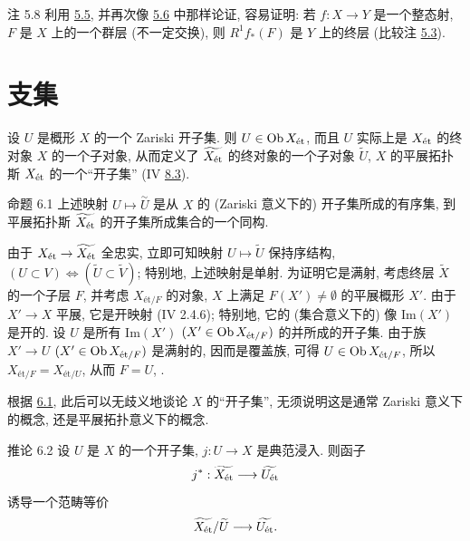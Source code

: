 \begin{enonce*}[remark]{注 5.8}
利用 \hyperref[VIII.prop5.5]{5.5},
并再次像 \hyperref[VIII.cor5.6]{5.6} 中那样论证, 容易证明:
若 $f:X\to Y$ 是一个整态射, $F$ 是 $X$ 上的一个群层 (不一定交换),
则 $R^1f_*(F)$ 是 $Y$ 上的终层 (比较注 \hyperref[VIII.rem5.3]{5.3}).
\end{enonce*}




\section{支集}\pageoriginale{}

设 $U$ 是概形 $X$ 的一个 Zariski 开子集.
则 $U \in \operatorname{Ob} X_{\text{\rm ét}}$,
而且 $U$ 实际上是 $X_{\text{\rm ét}}$ 的终对象 $X$ 的一个子对象,
从而定义了 $\widetilde{X_{\text{\rm ét}}}$ 的终对象的一个子对象 $\widetilde{U}$,
\ie $X$ 的平展拓扑斯 $X_{\text{\rm ét}}$ 的一个“开子集”
(IV \hyperref[IV.def8.3]{8.3}).

\begin{enonce*}{命题 6.1}
上述映射 $U \mapsto \overset{\sim}{U}$
是从 $X$ 的 (Zariski 意义下的) 开子集所成的有序集,
到平展拓扑斯 $\widetilde{X_{\text{\rm ét}}}$ 的开子集所成集合的一个同构.
\end{enonce*}

由于 $X_{\text{\rm ét}} \to \widetilde{X_{\text{\rm ét}}}$ 全忠实,
立即可知映射 $U \mapsto \widetilde{U}$ 保持序结构,
\ie $(U \subset V) \Leftrightarrow (\widetilde{U} \subset \widetilde{V})$;
特别地, 上述映射是单射.
为证明它是满射, 考虑终层 $\widetilde{X}$ 的一个子层 $F$,
并考虑 $X_{\text{ét}/ F}$ 的对象,
\ie $X$ 上满足 $F(X') \neq ∅$ 的平展概形 $X'$.
由于 $X' \to X$ 平展, 它是开映射 (\EGA IV 2.4.6);
特别地, 它的 (集合意义下的) 像 $\text{Im}(X')$ 是开的.
设 $U$ 是所有 $\text{Im}(X')$ $(X'\in \operatorname{Ob} X_{\text{ét} /  F})$ 的并所成的开子集.
由于族 $X'\to U$ $(X'\in \operatorname{Ob} X_{\text{ét}/F})$ 是满射的,
因而是覆盖族, 可得 $U \in \operatorname{Ob} X_{\text{ét}/F}$,
所以 $ X_{\text{ét}/F} =  X_{\text{ét}/U}$,
从而 $F = U$, \cqfd.

根据 \hyperref[VIII.prop6.1]{6.1},
此后可以无歧义地谈论 $X$ 的“开子集”,
无须说明这是通常 Zariski 意义下的概念, 还是平展拓扑意义下的概念.

\begin{enonce*}{推论 6.2}
设 $U$ 是 $X$ 的一个开子集, $j : U \to X$ 是典范浸入.
则函子
$$
j^{\ast} :  \widetilde{X_{\text{\rm ét}}} \to \widetilde{U_{\text{\rm ét}}}
$$
诱导\pageoriginale 一个范畴等价
$$
\widetilde{X_{\text{\rm ét}}} / \widetilde{U} \to
\widetilde{U_{\text{\rm ét}}}{\quoi}.
$$
\end{enonce*}

